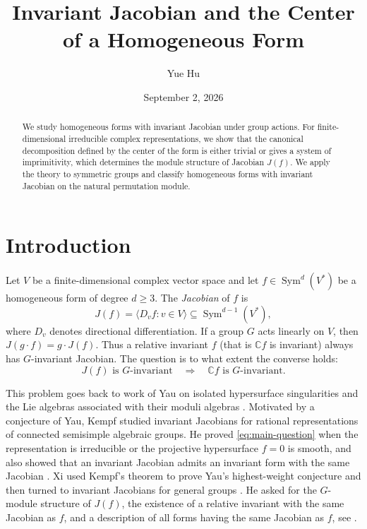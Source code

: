 \documentclass[11pt,reqno]{amsart}
\title{Invariant Jacobian and the Center of a Homogeneous Form}
\author[]{Yue Hu}
\date{September 2, 2026}
\numberwithin{equation}{section}
\theoremstyle{definition}
\theoremstyle{remark}
\newcommand{\C}{\mathbb C}
\newcommand{\Sym}{\operatorname{Sym}}
\begin{document}
\begin{abstract}
We study homogeneous forms with invariant Jacobian under 
group actions.  For finite-dimensional irreducible complex representations, we show
that the canonical decomposition defined by the center of the form
is either trivial or gives a system of imprimitivity, which  determines the module structure of Jacobian $J(f)$.  We apply the theory to symmetric groups and classify homogeneous forms with invariant Jacobian on the natural permutation module.
\end{abstract}

\maketitle

\section{Introduction}\label{sec:introduction}

Let $V$ be a finite-dimensional complex vector space and let
$f\in\Sym^d(V^*)$ be a homogeneous form of degree $d\geq3$.  The \emph{Jacobian}  of $f$  is
\begin{equation}\label{eq:intro-J}
  J(f)=\langle D_vf:v\in V\rangle
  \subseteq\Sym^{d-1}(V^*),
\end{equation}
where $D_v$ denotes directional differentiation. If a group $G$ acts linearly on $V$, then $J(g\cdot f)=g\cdot J(f)$. Thus a relative invariant $f$ (that is $\C f$ is invariant) always has $G$-invariant Jacobian.
The question is to what extent the converse holds:
\begin{equation}\label{eq:main-question}
  J(f)\text{ is $G$-invariant}
  \quad\Longrightarrow\quad
  \C f\text{ is $G$-invariant}.
\end{equation}

This problem goes back to work of Yau on isolated hypersurface
singularities and the Lie algebras associated with their moduli
algebras \cite{MatherYau,YauMemoir}. Motivated by a conjecture of Yau, Kempf studied invariant Jacobians for rational representations of connected semisimple algebraic groups.  He proved
\eqref{eq:main-question} when the representation is irreducible
or the projective hypersurface $f=0$ is smooth,  and
also showed that an invariant Jacobian admits an invariant form with the same Jacobian \cite{Kempf}.  Xi used Kempf's theorem to prove
Yau's highest-weight conjecture and then turned to invariant
Jacobians for general groups \cite{Xi}. He
asked for the $G$-module structure of $J(f)$, the existence of a
relative invariant with the same Jacobian as $f$, and a
description of all forms having the same Jacobian as $f$, see \cite[Section~3.5]{Xi}.
\end{document}
